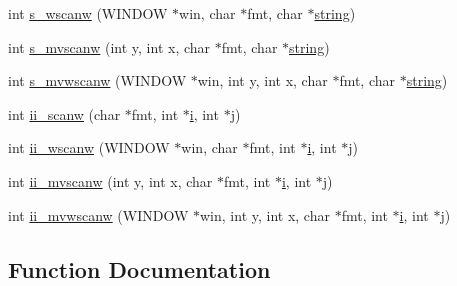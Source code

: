 \begin{DoxyCompactItemize}
\item 
int \hyperlink{C-macros_8c_a261b2a08296fc9699afe31cc2c578410}{s\+\_\+wscanw} (W\+I\+N\+D\+OW $\ast$win, char $\ast$fmt, char $\ast$\hyperlink{what__overview_81_8txt_a74cb7e955273b9f9157b4f0c18a38849}{string})
\item 
int \hyperlink{C-macros_8c_aadefc5909b2feb200bb34f11b0dd18d1}{s\+\_\+mvscanw} (int y, int x, char $\ast$fmt, char $\ast$\hyperlink{what__overview_81_8txt_a74cb7e955273b9f9157b4f0c18a38849}{string})
\item 
int \hyperlink{C-macros_8c_ad40ae826be88925237db3a46518ca603}{s\+\_\+mvwscanw} (W\+I\+N\+D\+OW $\ast$win, int y, int x, char $\ast$fmt, char $\ast$\hyperlink{what__overview_81_8txt_a74cb7e955273b9f9157b4f0c18a38849}{string})
\item 
int \hyperlink{C-macros_8c_a13c589c66da48838bef7ced902997126}{ii\+\_\+scanw} (char $\ast$fmt, int $\ast$\hyperlink{intro__blas1_83_8txt_a8ba82a50c0c2c12d5f6a77f7e4651c0b}{i}, int $\ast$\hyperlink{exit_87_8txt_a8921ef29c441e427867c54bd3b2462ba}{j})
\item 
int \hyperlink{C-macros_8c_a4cca36c361fd3bcc48fdb5d0b723d765}{ii\+\_\+wscanw} (W\+I\+N\+D\+OW $\ast$win, char $\ast$fmt, int $\ast$\hyperlink{intro__blas1_83_8txt_a8ba82a50c0c2c12d5f6a77f7e4651c0b}{i}, int $\ast$\hyperlink{exit_87_8txt_a8921ef29c441e427867c54bd3b2462ba}{j})
\item 
int \hyperlink{C-macros_8c_a620ec84aba8d1a5fadbba5724f1e01b8}{ii\+\_\+mvscanw} (int y, int x, char $\ast$fmt, int $\ast$\hyperlink{intro__blas1_83_8txt_a8ba82a50c0c2c12d5f6a77f7e4651c0b}{i}, int $\ast$\hyperlink{exit_87_8txt_a8921ef29c441e427867c54bd3b2462ba}{j})
\item 
int \hyperlink{C-macros_8c_a5116eef3b9a53d8f12436984bfec0717}{ii\+\_\+mvwscanw} (W\+I\+N\+D\+OW $\ast$win, int y, int x, char $\ast$fmt, int $\ast$\hyperlink{intro__blas1_83_8txt_a8ba82a50c0c2c12d5f6a77f7e4651c0b}{i}, int $\ast$\hyperlink{exit_87_8txt_a8921ef29c441e427867c54bd3b2462ba}{j})
\end{DoxyCompactItemize}


\subsection{Function Documentation}
\mbox{\label{C-macros_8c_a32e22b11dad68fa76c882dc89f0997f1}} 

